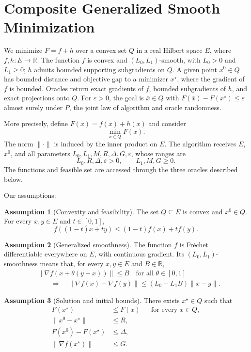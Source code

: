 \documentclass[10pt]{article}
\theoremstyle{definition}
\newtheorem{assumption}{Assumption}
\begin{document}
\section*{Composite Generalized Smooth Minimization}
We minimize $F=f+h$ over a convex set $Q$ in a real Hilbert space $E$, where $f,h:E\to\mathbb{R}$. The function $f$ is convex and $(L_0,L_1)$-smooth, with $L_0>0$ and $L_1\geq0$; $h$ admits bounded supporting subgradients on $Q$. A given point $x^0\in Q$ has bounded distance and objective gap to a minimizer $x^\star$, where the gradient of $f$ is bounded. Oracles return exact gradients of $f$, bounded subgradients of $h$, and exact projections onto $Q$. For $\varepsilon>0$, the goal is $\bar{x}\in Q$ with $F(\bar{x})-F(x^\star)\leq\varepsilon$ almost surely under $P$, the joint law of algorithm and oracle randomness.

More precisely, define $F(x)=f(x)+h(x)$ and consider
\[
\min_{x\in Q} F(x).
\]
The norm $\|\cdot\|$ is induced by the inner product on $E$. The algorithm receives $E$, $x^0$, and all parameters $L_0,L_1,M,R,\Delta,G,\varepsilon$, whose ranges are
\[
L_0,R,\Delta,\varepsilon>0,
\qquad L_1,M,G\geq0.
\]
The functions and feasible set are accessed through the three oracles described below.

Our assumptions:
\begin{assumption}[Convexity and feasibility]
The set $Q\subseteq E$ is convex and $x^0\in Q$. For every $x,y\in E$ and $t\in[0,1]$,
\[
f((1-t)x+ty)\leq(1-t)f(x)+t f(y).
\]
\end{assumption}

\begin{assumption}[Generalized smoothness]
The function $f$ is Fr\'echet differentiable everywhere on $E$, with continuous gradient. Its $(L_0,L_1)$-smoothness means that, for every $x,y\in E$ and $B\in\mathbb{R}$,
\[
\begin{aligned}
&\|\nabla f(x+\theta(y-x))\|\leq B
\quad\text{for all }\theta\in[0,1]\\
&\qquad\Longrightarrow\quad
\|\nabla f(x)-\nabla f(y)\|
\leq (L_0+L_1B)\|x-y\|.
\end{aligned}
\]
\end{assumption}

\begin{assumption}[Solution and initial bounds]
There exists $x^\star\in Q$ such that
\[
\begin{aligned}
F(x^\star)&\leq F(x) &&\text{for every }x\in Q,\\
\|x^0-x^\star\|&\leq R,\\
F(x^0)-F(x^\star)&\leq\Delta,\\
\|\nabla f(x^\star)\|&\leq G.
\end{aligned}
\]
\end{assumption}
\end{document}
